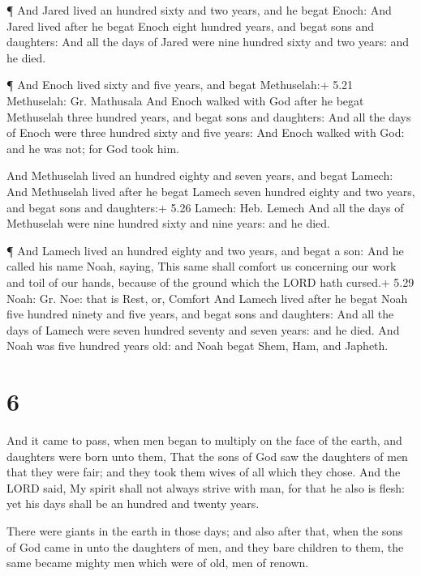  ¶ And Jared lived an hundred sixty and two years, and he
begat Enoch:  And Jared lived after he begat Enoch eight
hundred years, and begat sons and daughters:  And all the
days of Jared were nine hundred sixty and two years: and he died.

 ¶ And Enoch lived sixty and five years, and begat
Methuselah:+ 5.21 Methuselah: Gr. Mathusala  And Enoch
walked with God after he begat Methuselah three hundred years, and begat
sons and daughters:  And all the days of Enoch were three
hundred sixty and five years:  And Enoch walked with God:
and he was not; for God took him.

 And Methuselah lived an hundred eighty and seven years,
and begat Lamech:  And Methuselah lived after he begat
Lamech seven hundred eighty and two years, and begat sons and
daughters:+ 5.26 Lamech: Heb. Lemech  And all the days of
Methuselah were nine hundred sixty and nine years: and he died.

 ¶ And Lamech lived an hundred eighty and two years, and
begat a son:  And he called his name Noah, saying, This
same shall comfort us concerning our work and toil of our hands, because
of the ground which the LORD hath cursed.+ 5.29 Noah: Gr. Noe: that is
Rest, or, Comfort  And Lamech lived after he begat Noah
five hundred ninety and five years, and begat sons and daughters:
 And all the days of Lamech were seven hundred seventy and
seven years: and he died.  And Noah was five hundred years
old: and Noah begat Shem, Ham, and Japheth.

\hypertarget{section-5}{%
\section{6}\label{section-5}}

 And it came to pass, when men began to multiply on the face
of the earth, and daughters were born unto them,  That the
sons of God saw the daughters of men that they were fair; and they took
them wives of all which they chose.  And the LORD said, My
spirit shall not always strive with man, for that he also is flesh: yet
his days shall be an hundred and twenty years.

 There were giants in the earth in those days; and also
after that, when the sons of God came in unto the daughters of men, and
they bare children to them, the same became mighty men which were of
old, men of renown.

